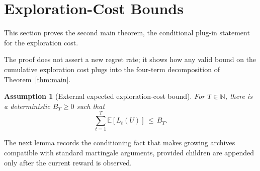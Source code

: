 \documentclass{article} %
\newtheorem{assumption}{Assumption}
\begin{document}
\section{Exploration-Cost Bounds}

\label{app:proofs2}

This section proves the second main theorem, the conditional plug-in statement for the exploration cost.

The proof does not assert a new regret rate; it shows how any valid bound on the cumulative exploration cost plugs into the four-term decomposition of Theorem~\ref{thm:main}.

\begin{assumption}[External expected exploration-cost bound]
\label{ass:app-external-tax}
For \(T\in\mathbb N\), there is a deterministic \(B_T\geq0\) such that
\begin{equation}
\label{eq:app-external-tax-assumption}
\sum_{t=1}^{T}\mathbb{E}[L_t(U)]
\,\leq\,
B_T.
\end{equation}
\end{assumption}

The next lemma records the conditioning fact that makes growing archives compatible with standard martingale arguments, provided children are appended only after the current reward is observed.
\end{document}
